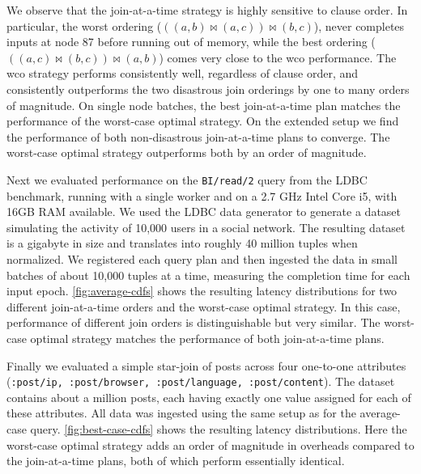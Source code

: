 \documentclass[../catalog.tex]{subfiles}
\begin{document}
We observe that the join-at-a-time strategy is highly sensitive to
clause order. In particular, the worst ordering ($((a,b) \bowtie
(a,c)) \bowtie (b,c)$), never completes inputs at node 87 before
running out of memory, while the best ordering ($((a,c) \bowtie (b,c))
\bowtie (a,b)$) comes very close to the wco performance. The wco
strategy performs consistently well, regardless of clause order, and
consistently outperforms the two disastrous join orderings by one to
many orders of magnitude. On single node batches, the best
join-at-a-time plan matches the performance of the worst-case optimal
strategy. On the extended setup we find the performance of both
non-disastrous join-at-a-time plans to converge. The worst-case
optimal strategy outperforms both by an order of magnitude.

Next we evaluated performance on the \texttt{BI/read/2} query from the
LDBC benchmark, running with a single worker and on a 2.7 GHz Intel
Core i5, with 16GB RAM available. We used the LDBC data generator to
generate a dataset simulating the activity of 10,000 users in a social
network. The resulting dataset is a gigabyte in size and translates
into roughly 40 million tuples when normalized. We registered each
query plan and then ingested the data in small batches of about 10,000
tuples at a time, measuring the completion time for each input
epoch. \autoref{fig:average-cdfs} shows the resulting latency
distributions for two different join-at-a-time orders and the
worst-case optimal strategy. In this case, performance of different
join orders is distinguishable but very similar. The worst-case
optimal strategy matches the performance of both join-at-a-time plans.

Finally we evaluated a simple star-join of posts across four
one-to-one attributes (\texttt{:post/ip, :post/browser,
  :post/language, :post/content}). The dataset contains about a
million posts, each having exactly one value assigned for each of
these attributes. All data was ingested using the same setup as for
the average-case query. \autoref{fig:best-case-cdfs} shows the
resulting latency distributions. Here the worst-case optimal strategy
adds an order of magnitude in overheads compared to the join-at-a-time
plans, both of which perform essentially identical.
\end{document}
